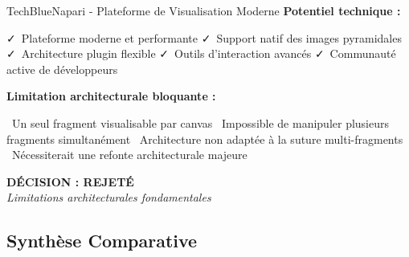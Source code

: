 \documentclass[12pt,a4paper]{report}
\newcommand{\pro}[1]{\textcolor{SuccessGreen}{\faCheck\ #1}}
\newcommand{\con}[1]{\textcolor{DangerRed}{\faTimes\ #1}}
\begin{document}
\begin{}
\begin{}
\begin{}
\begin{techbox}{TechBlue}{Napari - Plateforme de Visualisation Moderne}
\textbf{Potentiel technique :}
\begin{itemize}[leftmargin=*]
    \pro{Plateforme moderne et performante}
    \pro{Support natif des images pyramidales}
    \pro{Architecture plugin flexible}
    \pro{Outils d'interaction avancés}
    \pro{Communauté active de développeurs}
\end{itemize}

\textbf{Limitation architecturale bloquante :}
\begin{itemize}[leftmargin=*]
    \con{Un seul fragment visualisable par canvas}
    \con{Impossible de manipuler plusieurs fragments simultanément}
    \con{Architecture non adaptée à la suture multi-fragments}
    \con{Nécessiterait une refonte architecturale majeure}
\end{itemize}

\begin{center}
\textbf{\textcolor{DangerRed}{DÉCISION : REJETÉ}}\\
\textit{Limitations architecturales fondamentales}
\end{center}

\end{techbox}

\subsection{Synthèse Comparative}


\end{}
\end{}
\end{}
\end{document}
